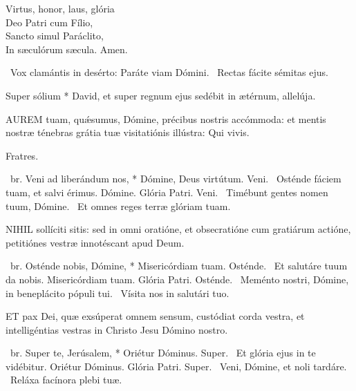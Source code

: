 Virtus, honor, laus, glória\\
Deo Patri cum Fílio,\\
Sancto simul Paráclito,\\
In sæculórum sæcula. Amen.

\V\ Vox clamántis in desérto: Paráte viam Dómini. \R\ Rectas fácite sémitas ejus.

 Super sólium * David, et super regnum ejus sedébit in ætérnum, allelúja.


\lettrine[lines=2]{A}{UREM} tuam, quǽsumus, Dómine, précibus nostris accómmoda: et mentis nostræ ténebras grátia tuæ visitatiónis illústra: Qui vivis.


 Fratres. 

\R\ br. Veni ad liberándum nos, * Dómine, Deus virtútum. Veni. \V\ Osténde fáciem tuam, et salvi érimus. Dómine. Glória Patri. Veni. \V\ Timébunt gentes nomen tuum, Dómine. \R\ Et omnes reges terræ glóriam tuam.



\lettrine[lines=2]{N}{IHIL} sollíciti sitis: sed in omni oratióne, et obsecratióne cum gratiárum actióne, petitiónes vestræ innotéscant apud Deum.

\R\ br. Osténde nobis, Dómine, * Misericórdiam tuam. Osténde. \V\ Et salutáre tuum da nobis. Misericórdiam tuam. Glória Patri. Osténde. \V\ Meménto nostri, Dómine, in beneplácito pópuli tui. \R\ Vísita nos in salutári tuo.



\lettrine[lines=2]{E}{T} pax Dei, quæ exsúperat omnem sensum, custódiat corda vestra, et intelligéntias vestras in Christo Jesu Dómino nostro.

\R\ br. Super te, Jerúsalem, * Oriétur Dóminus. Super. \V\ Et glória ejus in te vidébitur. Oriétur Dóminus. Glória Patri. Super. \V\ Veni, Dómine, et noli tardáre. \R\ Reláxa facínora plebi tuæ.




